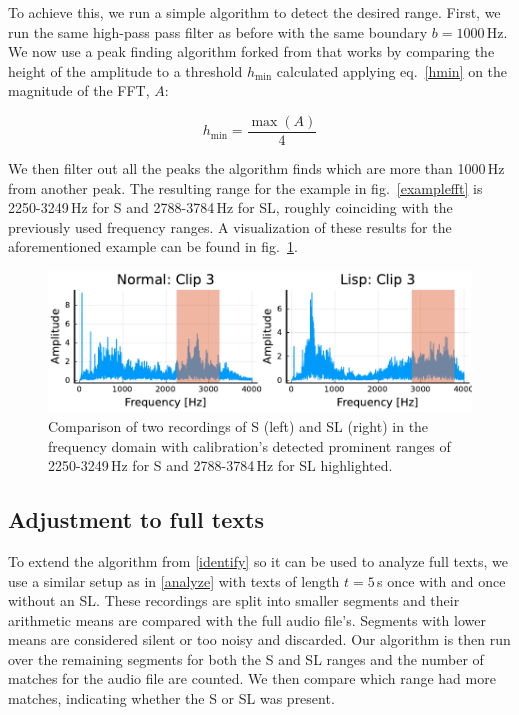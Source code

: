\documentclass{IEEEtran}
\begin{document}
To achieve this,
we run a simple algorithm to detect the desired range.
First, we run the same high-pass pass filter as before with the same boundary \(b = 1000\)\,Hz.
We now use a peak finding algorithm forked from \cite{findpeaks} that works by comparing the height of the amplitude to a threshold \(h_\mathrm{min}\) calculated applying eq.\ \ref{hmin} on the magnitude of the FFT, \(A\):

\begin{equation}
h_\mathrm{min} = \frac{\max(A)}{4}
\label{hmin}
\end{equation}

We then filter out all the peaks the algorithm finds which are more than 1000\,Hz from another peak.
The resulting range for the example in fig.\ \ref{examplefft} is 2250-3249\,Hz for S and 2788-3784\,Hz for SL,
roughly coinciding with the previously used frequency ranges.
A visualization of these results for the aforementioned example can be found in fig.\ \ref{examplecalibration}.

\begin{figure}[h]
\centering
\includegraphics[scale=0.55]{calibration.pdf}
\caption{Comparison of two recordings of S (left) and SL (right) in the frequency domain with calibration's detected prominent ranges of 2250-3249\,Hz for S and 2788-3784\,Hz for SL highlighted.}\label{examplecalibration}
\end{figure}

\subsection{Adjustment to full texts}\label{texts}

To extend the algorithm from \ref{identify} so it can be used to analyze full texts,
we use a similar setup as in \ref{analyze} with texts of length \(t = 5\)\,s once with and once without an SL.
These recordings are split into smaller segments and their arithmetic means are compared with the full audio file's.
Segments with lower means are considered silent or too noisy and discarded.
Our algorithm is then run over the remaining segments for both the S and SL ranges and the number of matches for the audio file are counted.
We then compare which range had more matches,
indicating whether the S or SL was present.
\end{document}
